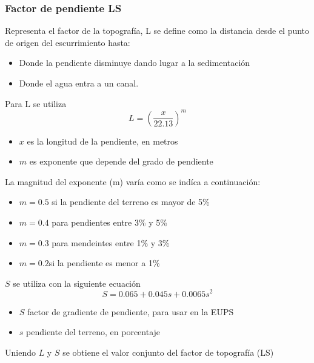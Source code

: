     \subsubsection{Factor de pendiente LS}
    Representa el factor de la topografía, L se define como la distancia desde el punto de origen del escurrimiento hasta:
    \begin{itemize}
        \item Donde la pendiente disminuye dando lugar a la sedimentación
        \item Donde el agua entra a un canal.
    \end{itemize}
    Para L se utiliza
    \begin{equation}
        L =\left(\frac{x}{22.13}\right)^m
    \end{equation}
    \begin{notation}
        \begin{itemize}
            \item $x$ es la longitud de la pendiente, en metros
            \item $m$ es exponente que depende del grado de pendiente
        \end{itemize}
    \end{notation}
    La magnitud del exponente (m) varía como se indíca a continuación:
    \begin{itemize}
        \item $m=0.5$ si la pendiente del terreno es mayor de 5\%
        \item $m= 0.4$ para pendientes entre 3\% y 5\%
        \item $m= 0.3$ para mendeintes entre 1\% y 3\%
        \item $m=0.2 $si la pendiente es menor a 1\%
    \end{itemize}
    $S$ se utiliza con la siguiente ecuación
    \begin{equation}
        S = 0.065 +0.045s + 0.0065s^2
    \end{equation}
    \begin{notation}
        \begin{itemize}
            \item $S$ factor de gradiente de pendiente, para usar en la EUPS
            \item $s$ pendiente del terreno, en porcentaje
        \end{itemize}
        Uniendo $L$ y $S$ se obtiene el valor conjunto del factor de topografía (LS)
    \end{notation}
